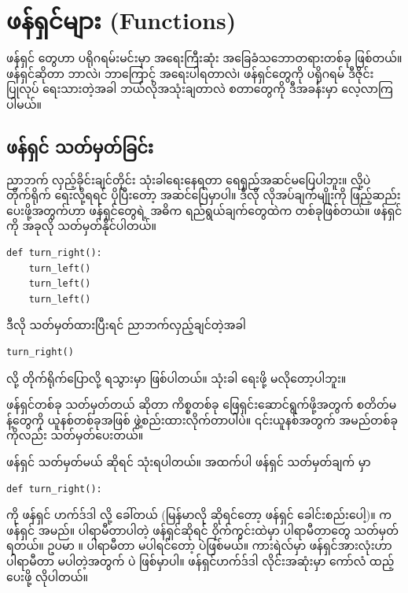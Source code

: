 \chapter{ဖန်ရှင်များ (Functions)}\label{ch:ch03}

ဖန်ရှင်  တွေဟာ ပရိုဂရမ်းမင်းမှာ အရေးကြီးဆုံး အခြေခံသဘောတရားတစ်ခု ဖြစ်တယ်။ ဖန်ရှင်ဆိုတာ ဘာလဲ၊ ဘာကြောင့် အရေးပါရတာလဲ၊ ဖန်ရှင်တွေကို ပရိုဂရမ် ဒီဇိုင်းပြုလုပ် ရေးသားတဲ့အခါ ဘယ်လိုအသုံးချတာလဲ စတာတွေကို ဒီအခန်းမှာ လေ့လာကြပါမယ်။

\section{ဖန်ရှင် သတ်မှတ်ခြင်း}
ညာဘက် လှည့်ခိုင်းချင်တိုင်း  သုံးခါရေးနေရတာ ရေရှည်အဆင်မပြေပါဘူး။  လို့ပဲ တိုက်ရိုက် ရေးလို့ရရင် ပိုပြီးတော့ အဆင်ပြေမှာပါ။ ဒီလို လိုအပ်ချက်မျိုးကို ဖြည့်ဆည်း ပေးဖို့အတွက်ဟာ ဖန်ရှင်တွေရဲ့ အဓိက ရည်ရွယ်ချက်တွေထဲက တစ်ခုဖြစ်တယ်။  ဖန်ရှင်ကို အခုလို သတ်မှတ်နိုင်ပါတယ်။
%
\setlength{\fboxsep}{0pt}
\begin{verbatim}
def turn_right():
    turn_left()
    turn_left()
    turn_left()
\end{verbatim}
%
ဒီလို သတ်မှတ်ထားပြီးရင် ညာဘက်လှည့်ချင်တဲ့အခါ 
%
\setlength{\fboxsep}{0pt}
\begin{verbatim}
turn_right()
\end{verbatim}
%
လို့ တိုက်ရိုက်ပြောလို့ ရသွားမှာ ဖြစ်ပါတယ်။  သုံးခါ ရေးဖို့ မလိုတော့ပါဘူး။

ဖန်ရှင်တစ်ခု သတ်မှတ်တယ်  ဆိုတာ ကိစ္စတစ်ခု ဖြေရှင်းဆောင်ရွက်ဖို့အတွက် စတိတ်မန့်တွေကို ယူနစ်တစ်ခုအဖြစ် ဖွဲ့စည်းထားလိုက်တာပါပဲ။ ၎င်းယူနစ်အတွက် အမည်တစ်ခုကိုလည်း သတ်မှတ်ပေးတယ်။ 

ဖန်ရှင် သတ်မှတ်မယ် ဆိုရင်   သုံးရပါတယ်။ အထက်ပါ  ဖန်ရှင် သတ်မှတ်ချက်  မှာ 
%
\setlength{\fboxsep}{0pt}
\begin{verbatim}
def turn_right():
\end{verbatim}
%
ကို ဖန်ရှင် ဟက်ဒ်ဒါ  လို့ ခေါ်တယ် (မြန်မာလို ဆိုရင်တော့ ဖန်ရှင် ခေါင်းစည်းပေါ့)။  က ဖန်ရှင် အမည်။ ပါရာမီတာပါတဲ့ ဖန်ရှင်ဆိုရင် ဝိုက်ကွင်းထဲမှာ ပါရာမီတာတွေ သတ်မှတ်ရတယ်။ ဥပမာ ။ ပါရာမီတာ မပါရင်တော့ \fEn{\fCode{()}} ပဲဖြစ်မယ်။ ကားရဲလ်မှာ ဖန်ရှင်အားလုံးဟာ ပါရာမီတာ မပါတဲ့အတွက် \fEn{\fCode{()}} ပဲ ဖြစ်မှာပါ။ ဖန်ရှင်ဟက်ဒ်ဒါ လိုင်းအဆုံးမှာ ကော်လံ  ထည့်ပေးဖို့ လိုပါတယ်။ 


